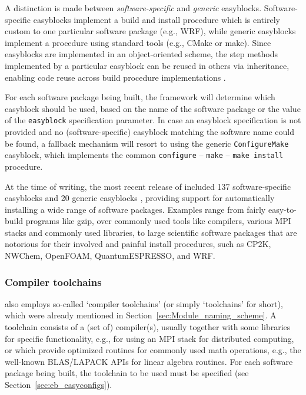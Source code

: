 A distinction is made between \emph{software-specific} and \emph{generic} easyblocks.
Software-specific easyblocks implement a build and install procedure which is
entirely custom to one particular software package (e.g., WRF), while
generic easyblocks implement a procedure using standard tools (e.g., CMake or
make). Since easyblocks are implemented in an object-oriented scheme,
the step methods implemented by a particular easyblock can be reused in others via
inheritance, enabling code reuse across build procedure implementations
.

For each software package being built, the \easybuild{} framework will determine
which easyblock should be used, based on the name of the software package or the
value of the \texttt{\small easyblock} specification parameter. In case an easyblock
specification is not provided and no (software-specific) easyblock matching the
software name could be found, a fallback mechanism will resort to using the generic
\texttt{\small ConfigureMake} easyblock, which implements the common
\texttt{\small configure} -- \texttt{\small make} -- \texttt{\small make install}
procedure.

At the time of writing, the most recent release of \easybuild{} included 137
software-specific easyblocks and 20 generic easyblocks , providing support for
automatically installing a wide range of software packages. Examples range
from fairly easy-to-build programs like gzip, over commonly used  tools like
compilers, various MPI stacks and commonly used libraries, to large scientific
software packages that are notorious for their involved and painful install
procedures, such as CP2K, NWChem, OpenFOAM, QuantumESPRESSO, and WRF.

\subsubsection{Compiler toolchains}
\label{sec:eb_toolchains}

\easybuild{} also employs so-called `compiler toolchains' (or simply `toolchains'
for short), which were already mentioned in Section~\ref{sec:Module_naming_scheme}.
A toolchain consists of a (set of) compiler(s), usually together with some
libraries for specific functionality, e.g., for using an MPI stack for distributed
computing, or which provide optimized routines for commonly used math operations,
e.g., the well-known BLAS/LAPACK APIs for linear algebra routines. For each software
package being built, the toolchain to be used must be specified
(see Section~\ref{sec:eb_easyconfigs}).

